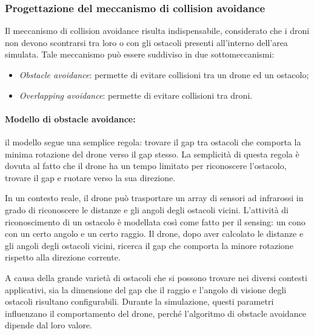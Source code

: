 \subsubsection{Progettazione del meccanismo di collision avoidance}

Il meccanismo di collision avoidance risulta indispensabile, considerato che i droni non devono scontrarsi tra loro o con gli ostacoli presenti all'interno dell'area simulata.
Tale meccanismo può essere suddiviso in due sottomeccanismi:

\begin{itemize}
    \item \textit{Obstacle avoidance}: permette di evitare collisioni tra un drone ed un ostacolo;
    \item \textit{Overlapping avoidance}: permette di evitare collisioni tra droni.
\end{itemize}

\paragraph{Modello di obstacle avoidance:} il modello segue una semplice regola: trovare il gap tra ostacoli che comporta la minima rotazione del drone verso il gap stesso. 
La semplicità di questa regola è dovuta al fatto che il drone ha un tempo limitato per riconoscere l’ostacolo, trovare il gap e ruotare verso la sua direzione.

In un contesto reale, il drone può trasportare un array di sensori ad infrarossi in grado di riconoscere le distanze e gli angoli degli ostacoli vicini. 
L’attività di riconoscimento di un ostacolo è modellata così come fatto per il sensing: un cono con un certo angolo e un certo raggio. 
Il drone, dopo aver calcolato le distanze e gli angoli degli ostacoli vicini, ricerca il gap che comporta la minore rotazione rispetto alla direzione corrente.

A causa della grande varietà di ostacoli che si possono trovare nei diversi contesti applicativi, sia la dimensione del gap che il raggio e l’angolo di visione degli ostacoli risultano configurabili. 
Durante la simulazione, questi parametri influenzano il comportamento del drone, perché l’algoritmo di obstacle avoidance dipende dal loro valore.


